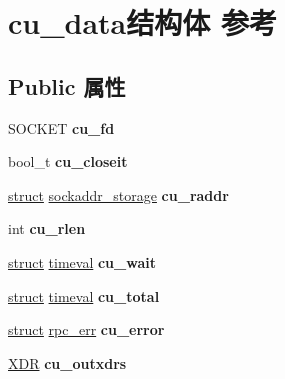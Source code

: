 \hypertarget{structcu__data}{}\section{cu\+\_\+data结构体 参考}
\label{structcu__data}
\subsection*{Public 属性}
\begin{DoxyCompactItemize}
\item 
\mbox{\label{structcu__data_a184824d36eb36d66f622af2c2a1b79b1}} 
S\+O\+C\+K\+ET {\bfseries cu\+\_\+fd}
\item 
\mbox{\label{structcu__data_a01ffed15c404496727f6aefffd747d59}} 
bool\+\_\+t {\bfseries cu\+\_\+closeit}
\item 
\mbox{\label{structcu__data_ad2550491e003cd7d054254ff72514f58}} 
\hyperlink{interfacestruct}{struct} \hyperlink{structsockaddr__storage}{sockaddr\+\_\+storage} {\bfseries cu\+\_\+raddr}
\item 
\mbox{\label{structcu__data_a8a66684b60e42b5a607780f32ca937dd}} 
int {\bfseries cu\+\_\+rlen}
\item 
\mbox{\label{structcu__data_a1bab0087833328ada369308dcca6ad92}} 
\hyperlink{interfacestruct}{struct} \hyperlink{structtimeval}{timeval} {\bfseries cu\+\_\+wait}
\item 
\mbox{\label{structcu__data_afacb52c7b5df3b4568520716834a919b}} 
\hyperlink{interfacestruct}{struct} \hyperlink{structtimeval}{timeval} {\bfseries cu\+\_\+total}
\item 
\mbox{\label{structcu__data_a95e960a6a602b1c95a5325e3321aa4b9}} 
\hyperlink{interfacestruct}{struct} \hyperlink{structrpc__err}{rpc\+\_\+err} {\bfseries cu\+\_\+error}
\item 
\mbox{\label{structcu__data_aabf7154b265fac4d2ba598f80881c534}} 
\hyperlink{struct____rpc__xdr}{X\+DR} {\bfseries cu\+\_\+outxdrs}
\item 
\mbox{\label{structcu__data_aa587fdc508df8ffad30a49ca253554a9}} 

\end{DoxyCompactItemize}
